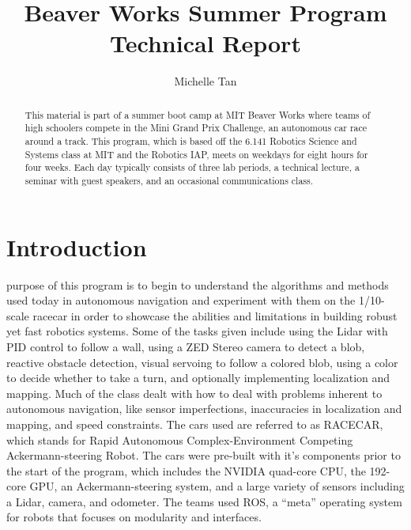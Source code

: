 \documentclass[journal, a4paper]{IEEEtran}
\begin{document}
    \title{Beaver Works Summer Program Technical Report}
    \author{Michelle Tan}
    \maketitle

\begin{abstract}
    This material is part of a summer boot camp at MIT Beaver Works where teams of high schoolers compete in the Mini Grand Prix Challenge, an autonomous car race around a track. This program, which is based off the 6.141 Robotics Science and Systems class at MIT and the Robotics IAP, meets on weekdays for eight hours for four weeks. Each day typically consists of three lab periods, a technical lecture, a seminar with guest speakers, and an occasional communications class. 
\end{abstract}
\section{Introduction}
     purpose of this program is to begin to understand the algorithms and methods used today in autonomous navigation and experiment with them on the 1/10-scale racecar in order to showcase the abilities and limitations in building robust yet fast robotics systems. Some of the tasks given include using the Lidar with PID control to follow a wall, using a ZED Stereo camera to detect a blob, reactive obstacle detection, visual servoing to follow a colored blob, using a color to decide whether to take a turn, and optionally implementing localization and mapping. Much of the class dealt with how to deal with problems inherent to autonomous navigation, like sensor imperfections, inaccuracies in localization and mapping, and speed constraints. The cars used are referred to as RACECAR, which stands for Rapid Autonomous Complex-Environment Competing Ackermann-steering Robot. The cars were pre-built with it’s components prior to the start of the program, which includes the NVIDIA quad-core CPU, the 192-core GPU, an Ackermann-steering system, and a large variety of sensors including a Lidar, camera, and odometer. The teams used ROS, a “meta” operating system for robots that focuses on modularity and interfaces. 
\end{document}
